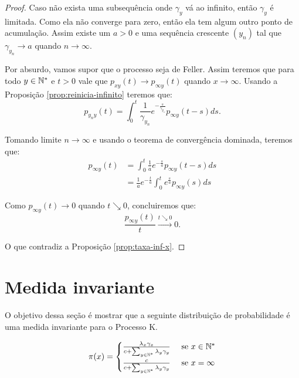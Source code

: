 \begin{proof}
  Caso não exista uma subsequência onde $\gamma_y$ vá ao infinito,
  então $\gamma_y$ é limitada. Como ela não converge para zero, então
  ela tem algum outro ponto de acumulação. Assim existe um $a > 0$ e
  uma sequência crescente $(y_n)$ tal que $\gamma_{y_n} \to a$ quando
  $n \to \infty$.

  Por absurdo, vamos supor que o processo seja de Feller. Assim
  teremos que para todo $y \in {\mathbb{N^*}}$ e $t > 0$ vale que $p_{x y} (t)
  \to p_{\infty y} (t)$ quando $x \to \infty$. Usando a Proposição
  \ref{prop:reinicia-infinito} teremos que:
  \begin{displaymath}
    p_{y_n y}(t) = \int_0^t \frac{1}{\gamma_{y_n}}
    e^{-\frac{s}{\gamma_{y_n}}} p_{\infty y} (t-s) ds.
  \end{displaymath}
  
  Tomando limite $n \to \infty$ e usando o teorema de convergência
  dominada, teremos que:
  \begin{align*}
     p_{\infty y}(t)
     &= \int_0^t \frac{1}{a} e^{-\frac{s}{a}} p_{\infty y}(t-s) d s\\
     &= \frac{1}{a} e^{-\frac{t}{a}} \int_0^t  e^{\frac{s}{a}} p_{\infty y}(s) d s
  \end{align*}

  Como  $p_{\infty y}(t) \to 0$ quando $t \searrow 0$, concluiremos que:
  \begin{displaymath}
    \frac{p_{\infty y}(t)}{t} \xrightarrow{t \searrow 0} 0.
  \end{displaymath}

  O que contradiz a Proposição \ref{prop:taxa-inf-x}.
\end{proof}


\section{Medida invariante}
\label{sec:invariante}

O objetivo dessa seção é mostrar que a seguinte distribuição de
probabilidade é uma medida invariante para o Processo K.

\begin{equation}
  \label{eq:invariante}
  \pi(x) = \begin{cases}
    \frac{\lambda_x \gamma_x}{c + \sum_{y \in {\mathbb{N^*}}} \lambda_y \gamma_y}
    & \textrm{ se } x \in {\mathbb{N^*}} \\
    \frac{c}{c + \sum_{y \in {\mathbb{N^*}}} \lambda_y \gamma_y}
    & \textrm{ se } x = \infty \\
  \end{cases}
\end{equation}

